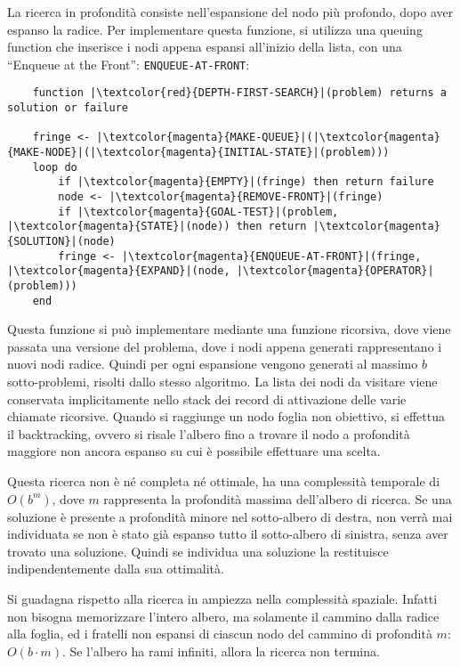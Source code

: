 \documentclass{article}
\numberwithin{equation}{subsection}
\begin{document}
La ricerca in profondità consiste nell'espansione del nodo più profondo, dopo aver espanso 
la radice. 
Per implementare questa funzione, si utilizza una queuing function che inserisce i nodi 
appena espansi all'inizio della lista, con una ``Enqueue at the Front'': \color{magenta}\verb|ENQUEUE-AT-FRONT|\color{black}:

\begin{verbatim}
    function |\textcolor{red}{DEPTH-FIRST-SEARCH}|(problem) returns a solution or failure
    
    fringe <- |\textcolor{magenta}{MAKE-QUEUE}|(|\textcolor{magenta}{MAKE-NODE}|(|\textcolor{magenta}{INITIAL-STATE}|(problem)))
    loop do
        if |\textcolor{magenta}{EMPTY}|(fringe) then return failure
        node <- |\textcolor{magenta}{REMOVE-FRONT}|(fringe)
        if |\textcolor{magenta}{GOAL-TEST}|(problem, |\textcolor{magenta}{STATE}|(node)) then return |\textcolor{magenta}{SOLUTION}|(node)
        fringe <- |\textcolor{magenta}{ENQUEUE-AT-FRONT}|(fringe, |\textcolor{magenta}{EXPAND}|(node, |\textcolor{magenta}{OPERATOR}|(problem)))
    end
\end{verbatim}

Questa funzione si può implementare mediante una funzione ricorsiva, dove viene 
passata una versione del problema, dove i nodi appena generati rappresentano i nuovi 
nodi radice. Quindi per ogni espansione vengono generati al massimo $b$ sotto-problemi, risolti 
dallo stesso algoritmo. La lista dei nodi da visitare viene conservata implicitamente nello 
stack dei record di attivazione delle varie chiamate ricorsive. Quando si raggiunge un nodo 
foglia non obiettivo, si effettua il backtracking, ovvero si risale l'albero fino a trovare il 
nodo a profondità maggiore non ancora espanso su cui è possibile effettuare una scelta. 

Questa ricerca non è né completa né ottimale, ha una complessità temporale di $O(b^m)$, dove 
$m$ rappresenta la profondità massima dell'albero di ricerca. Se una soluzione è presente a 
profondità minore nel sotto-albero di destra, non verrà mai individuata se non è stato già 
espanso tutto il sotto-albero di sinistra, senza aver trovato una soluzione. Quindi se individua 
una soluzione la restituisce indipendentemente dalla sua ottimalità. 

Si guadagna rispetto alla ricerca in ampiezza nella complessità spaziale. Infatti non bisogna 
memorizzare l'intero albero, ma solamente il cammino dalla radice alla foglia, ed i 
fratelli non espansi di ciascun nodo del cammino di profondità $m$: $O(b\cdot m)$. Se 
l'albero ha rami infiniti, allora la ricerca non termina. 
\end{document}
